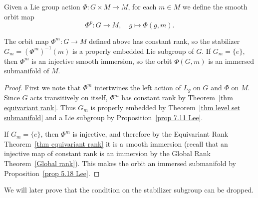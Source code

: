 \begin{defn}
    Given a Lie group action $\Phi:G\times M\to M$, for each $m\in M$ we define the smooth orbit map 
    \[\Phi^p:G\to M,\quad g\mapsto \Phi(g,m).\]
\end{defn}

\begin{prop}
    The orbit map $\Phi^m:G\to M$ defined above has constant rank, so the stabilizer $G_m=(\Phi^m)^{-1}(m)$ is a properly embedded Lie subgroup of $G$. If $G_m=\{e\}$, then $\Phi^m$ is an injective smooth immersion, so the orbit $\Phi(G,m)$ is an immersed submanifold of $M$.
\end{prop}
\begin{proof}
    First we note that $\Phi^m$ intertwines the left action of $L_g$ on $G$ and $\Phi$ on $M$. Since $G$ acts transitively on itself, $\Phi^m$ has constant rank by Theorem~\ref{thm equivariant rank}. Thus $G_m$ is properly embedded by Theorem~\ref{thm level set submanifold} and a Lie subgroup by Proposition~\ref{prop 7.11 Lee}.

    If $G_m=\{e\}$, then $\Phi^m$ is injective, and therefore by the Equivariant Rank Theorem~\ref{thm equivariant rank} it is a smooth immersion (recall that an injective map of constant rank is an immersion by the Global Rank Theorem~\ref{Global rank}). This makes the orbit an immersed submanifold by Proposition~\ref{prop 5.18 Lee}.
\end{proof}
\begin{rem}
    We will later prove that the condition on the stabilizer subgroup can be dropped.
\end{rem}

